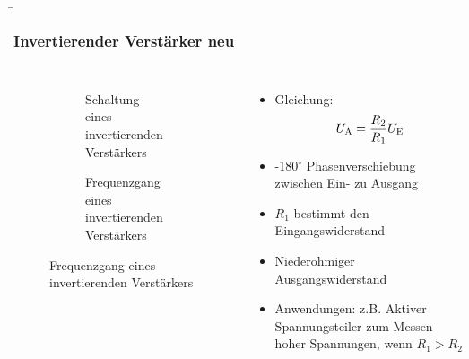 \begin{frame}
    \b{
    \frametitle{Invertierender Verstärker neu}
    \begin{columns}
        \centering
        \begin{figure}
    \centering

    \begin{subfigure}{\linewidth}
        \centering
        \resizebox{0.6\linewidth}{!}{}
        \caption{Schaltung eines invertierenden Verstärkers}
    \end{subfigure}

    \vspace{0.5cm} 

    \begin{subfigure}{\linewidth}
        \centering
        \resizebox{0.6\linewidth}{!}{}
        \caption{Frequenzgang eines invertierenden Verstärkers}
    \end{subfigure}

\end{figure}

        \begin{itemize}
            \item Gleichung:
           \[
    U_{\textnormal{A}} = \frac{R_2}{R_1} U_{\textnormal{E}}
            \]
    \item -180$^\circ$ Phasenverschiebung zwischen Ein- zu Ausgang
    \item $R_1$ bestimmt den Eingangswiderstand
    \item Niederohmiger Ausgangswiderstand
    \item Anwendungen: z.B. Aktiver Spannungsteiler zum Messen hoher Spannungen, wenn $R_1 > R_2$
        \end{itemize}
    \end{columns}
    }
\end{frame}

